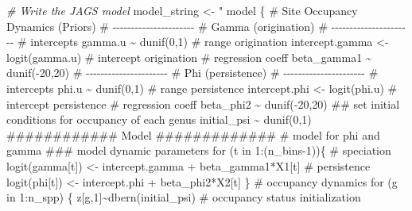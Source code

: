 \documentclass[
]{article}
\newenvironment{Shaded}{\begin{snugshade}}{\end{snugshade}}
\newcommand{\CommentTok}[1]{\textcolor[rgb]{0.56,0.35,0.01}{\textit{#1}}}
\newcommand{\NormalTok}[1]{#1}
\newcommand{\OtherTok}[1]{\textcolor[rgb]{0.56,0.35,0.01}{#1}}
\newcommand{\StringTok}[1]{\textcolor[rgb]{0.31,0.60,0.02}{#1}}
\begin{document}
{\begin{Shaded}
\begin{Highlighting}[]
\CommentTok{\# Write the JAGS model}
\NormalTok{model\_string }\OtherTok{\textless{}{-}} \StringTok{"}
\StringTok{model \{}
\StringTok{  }
\StringTok{      \# Site Occupancy Dynamics (Priors)}
\StringTok{       }
\StringTok{       }
\StringTok{        \# {-}{-}{-}{-}{-}{-}{-}{-}{-}{-}{-}{-}{-}{-}{-}{-}{-}{-}{-}{-}{-}{-}}
\StringTok{        \#     Gamma (origination)}
\StringTok{        \# {-}{-}{-}{-}{-}{-}{-}{-}{-}{-}{-}{-}{-}{-}{-}{-}{-}{-}{-}{-}{-}{-}}
\StringTok{        }
\StringTok{        \# intercepts}
\StringTok{        gamma.u \textasciitilde{} dunif(0,1) \# range origination}
\StringTok{        intercept.gamma \textless{}{-} logit(gamma.u) \# intercept origination}
\StringTok{        \# regression coeff}
\StringTok{        beta\_gamma1 \textasciitilde{} dunif({-}20,20)}
\StringTok{        }
\StringTok{        \# {-}{-}{-}{-}{-}{-}{-}{-}{-}{-}{-}{-}{-}{-}{-}{-}{-}{-}{-}{-}{-}{-}}
\StringTok{        \#     Phi (persistence)}
\StringTok{        \# {-}{-}{-}{-}{-}{-}{-}{-}{-}{-}{-}{-}{-}{-}{-}{-}{-}{-}{-}{-}{-}{-}}
\StringTok{        \# intercepts}
\StringTok{        phi.u \textasciitilde{} dunif(0,1) \# range persistence}
\StringTok{        intercept.phi \textless{}{-} logit(phi.u) \# intercept persistence}
\StringTok{        \# regression coeff}
\StringTok{        beta\_phi2 \textasciitilde{} dunif({-}20,20)}
\StringTok{        }
\StringTok{        }
\StringTok{        \#\# set initial conditions for occupancy of each genus}
\StringTok{        initial\_psi \textasciitilde{} dunif(0,1)}
\StringTok{        }
\StringTok{           }
\StringTok{       \#\#\#\#\#\#\#\#\#\#\#\#      Model       \#\#\#\#\#\#\#\#\#\#\#\#\#}
\StringTok{       }
\StringTok{       \# model for phi and gamma}
\StringTok{       \#\#\# model dynamic parameters}
\StringTok{        }
\StringTok{        for (t in 1:(n\_bins{-}1))\{}
\StringTok{      }
\StringTok{             \# speciation}
\StringTok{             logit(gamma[t]) \textless{}{-}  intercept.gamma + }
\StringTok{                                   beta\_gamma1*X1[t]}
\StringTok{                                   }
\StringTok{              \# persistence}
\StringTok{              logit(phi[t]) \textless{}{-}  intercept.phi + }
\StringTok{                                  beta\_phi2*X2[t]}
\StringTok{                                  }
\StringTok{                                  }
\StringTok{        \}}
\StringTok{        }
\StringTok{       }
\StringTok{                       }
\StringTok{      \# occupancy dynamics}
\StringTok{       }
\StringTok{        for (g in 1:n\_spp) \{}
\StringTok{         }
\StringTok{            z[g,1]\textasciitilde{}dbern(initial\_psi) \# occupancy status initialization}

\end{Highlighting}
\end{Shaded}}
\end{document}
